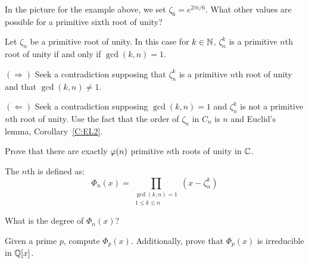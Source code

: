 \documentclass{ximera}
\begin{document}
\begin{exercise}
  In the picture for the example above, we set $\zeta_6 =e^{2\pi
    i/6}$. What other values are possible for a primitive sixth root
  of unity?
\end{exercise}




\begin{theorem} 
Let $\zeta_n$ be a primitive root of unity. In this case for $k\in\mathbb N$,
$\zeta_n^k$ is a primitive $n$th root of unity if and only if
$\gcd(k,n) = 1$.

\begin{sketch} 
$(\Rightarrow)$ Seek a contradiction supposing that $\zeta_n^k$ is a
  primitive $n$th root of unity and that $\gcd(k,n) \ne 1$.

$(\Leftarrow)$ Seek a contradiction supposing $\gcd(k,n) = 1$ and
  $\zeta_n^k$ is not a primitive $n$th root of unity. Use the fact
  that the order of $\zeta_n$ in $C_n$ is $n$ and Euclid's lemma,
  Corollary~\ref{C:EL2}.
\end{sketch}
\end{theorem}



\begin{exercise}
  Prove that there are exactly $\eulerphi(n)$ primitive $n$th roots of
  unity in $\mathbb C$.
\end{exercise}






\begin{definition}
The $n$th  is defined as:
\[
\Phi_n(x) = \prod_{\substack{\gcd(k,n)=1 \\ 1\le k\le n}}(x-\zeta_n^k)
\]
\end{definition}

\begin{exercise}
  What is the degree of $\Phi_n(x)$?
\end{exercise}

\begin{exercise}
  Given a prime $p$, compute $\Phi_p(x)$. Additionally, prove that
  $\Phi_p(x)$ is irreducible in $\mathbb Q[x]$.
\end{exercise}
\end{document}
